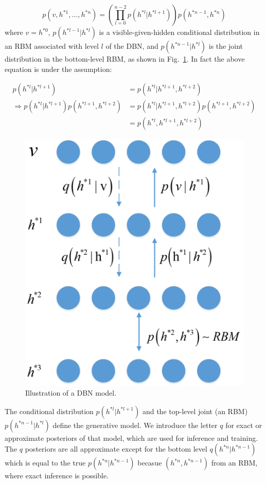 \documentclass[runningheads,openany]{xhlPaper}
\begin{document}
\begin{equation}
\label{equ:dbn_joint_distribution}
p\left( {v,{h^{*1}},...,{h^{*n}}} \right) = \left( {\prod\limits_{l = 0}^{n - 2} {p\left( {{h^{*l}}|{h^{*l + 1}}} \right)} } \right)p\left( {{h^{*n - 1}},{h^{*n}}} \right)
\end{equation}
where $v = h^{*0}$, $p\left(h^{*l-1}|h^{*l}\right)$ is a visible-given-hidden conditional distribution in an RBM associated with level $l$ of the DBN, and $p\left(h^{*n-1}|h^{*l}\right)$ is the joint distribution in the bottom-level RBM, as shown in Fig.~\ref{fig:dbn}.
In fact the above equation is under the assumption:

\begin{displaymath}
\label{equ:dbn_under_assumption}
\begin{aligned}
p\left( {{h^{*l}}|{h^{*l + 1}}} \right) &= p\left( {{h^{*l}}|{h^{*l + 1}},{h^{*l + 2}}} \right)\\
 \Rightarrow p\left( {{h^{*l}}|{h^{*l + 1}}} \right)p\left( {{h^{*l + 1}},{h^{*l + 2}}} \right) &= p\left( {{h^{*l}}|{h^{*l + 1}},{h^{*l + 2}}} \right)p\left( {{h^{*l + 1}},{h^{*l + 2}}} \right)\\
 &= p\left( {{h^{*l}},{h^{*l + 1}},{h^{*l + 2}}} \right)
\end{aligned}
\end{displaymath}

\begin{figure}
\centering
\includegraphics[width=0.6\linewidth]{dbn}
\caption{Illustration of a DBN model.}
\label{fig:dbn}
\end{figure}

The conditional distribution $p\left(h^{*l}|h^{*l+1}\right)$ and the top-level joint (an RBM) $p\left(h^{*n-1}|h^{*l}\right)$ define the generative model.
We introduce the letter $q$ for exact or approximate posteriors of that model, which are used for inference and training.
The $q$ posteriors are all approximate except for the bottom level $q\left(h^{*n}|h^{*n-1}\right)$ which is equal to the true $p\left(h^{*n}|h^{*n-1}\right)$ becasue $\left(h^{*n}, h^{*n-1}\right)$ from an RBM, where exact inference is possible.
\end{document}
